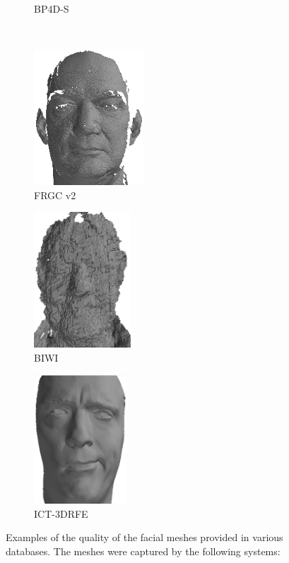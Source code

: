 \begin{figure}[h]
\begin{subfigure}[b]{0.3\textwidth}
		\caption{BP4D-S~\cite{Zhang:2014id}}\label{fig:db_examples_bp4d}
	\end{subfigure} \\
	\begin{subfigure}[b]{0.3\textwidth}
		\centering
		\includegraphics[height=2in]{background/images/frgc}
		\caption{FRGC v2~\cite{phillips2005overview}}\label{fig:db_examples_frgc}
	\end{subfigure}
	\begin{subfigure}[b]{0.3\textwidth}
		\centering
		\includegraphics[height=2in]{background/images/biwi}
		\caption{BIWI~\cite{fanelli2013random}}\label{fig:db_examples_biwi}
	\end{subfigure}
	\begin{subfigure}[b]{0.3\textwidth}
		\centering
		\includegraphics[height=1.9in]{background/images/ict}
		\caption{ICT-3DRFE~\cite{stratou2012exploring}}\label{fig:db_examples_ict}
	\end{subfigure}
	\caption{Examples of the quality of the facial meshes provided in various
	         databases. The meshes were captured by the following systems:
}
\end{figure}
